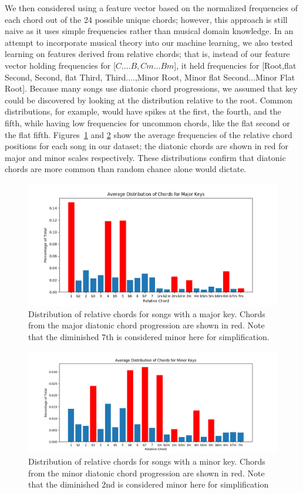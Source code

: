 \documentclass[letterpaper]{article}
\begin{document}
We then considered using a feature vector based on the normalized frequencies of each chord out of the 24 possible unique chords; however, this approach is still naive as it uses simple frequencies rather than musical domain knowledge.  In an attempt to incorporate musical theory into our machine learning, we also tested learning on features derived from relative chords; that is, instead of our feature vector holding frequencies for [$C....B,Cm...Bm$], it held frequencies for [Root,flat Second, Second, flat Third, Third....,Minor Root, Minor flat Second...Minor Flat Root].  Because many songs use diatonic chord progressions, we assumed that key could be discovered by looking at the distribution relative to the root.  Common distributions, for example, would have spikes at the first, the fourth, and the fifth, while having low frequencies for uncommon chords, like the flat second or the flat fifth.  Figures~\ref{major_average} and \ref{minor_average} show the average frequencies of the relative chord positions for each song in our dataset; the diatonic chords are shown in red for major and minor scales respectively.  These distributions confirm that diatonic chords are more common than random chance alone would dictate.

\begin{figure}
	\centering
	\includegraphics[width = \columnwidth]{major_average_dist.png}
	\caption{Distribution of relative chords for songs with a major key.  Chords from the major diatonic chord progression are shown in red.  Note that the diminished 7th is considered minor here for simplification.}
	\label{major_average} 
\end{figure}

\begin{figure}
	\centering
	\includegraphics[width = \columnwidth]{minor_average_dist.png}
	\caption{Distribution of relative chords for songs with a minor key.  Chords from the minor diatonic chord progression are shown in red.  Note that the diminished 2nd is considered minor here for simplification}
	\label{minor_average} 
\end{figure}
\end{document}
